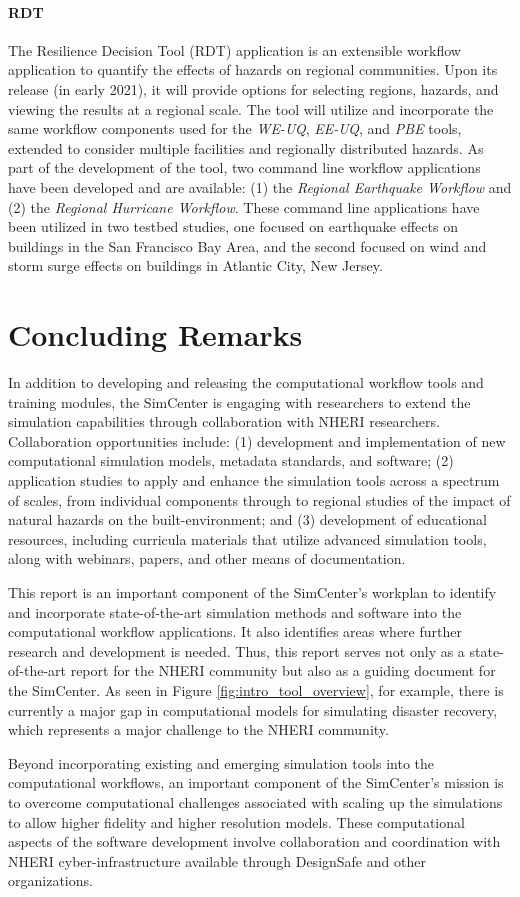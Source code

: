 \paragraph{RDT} The Resilience Decision Tool (RDT) application is an extensible workflow application to quantify the effects of hazards on regional communities. Upon its release (in early 2021), it will provide options for selecting regions, hazards, and viewing the results at a regional scale. The tool will utilize and incorporate the same workflow components used for the \emph{WE-UQ}, \emph{EE-UQ}, and \emph{PBE} tools, extended to consider multiple facilities and regionally distributed hazards. As part of the development of the tool, two command line workflow applications have been developed and are available: (1) the \emph{Regional Earthquake Workflow} and (2) the \emph{Regional Hurricane Workflow}.  These command line  applications have been utilized in two testbed studies, one focused on earthquake effects on buildings in the San Francisco Bay Area, and the second focused on wind and storm surge effects on buildings in Atlantic City, New Jersey.

\section{Concluding Remarks}

In addition to developing and releasing the computational workflow tools and training modules, the SimCenter is engaging with researchers to extend the simulation capabilities through collaboration with NHERI researchers. Collaboration opportunities include: (1) development and implementation of new computational simulation models, metadata standards, and software; (2) application studies to apply and enhance the simulation tools across a spectrum of scales, from individual components through to regional studies of the impact of natural hazards on the built-environment; and (3) development of educational resources, including curricula materials that utilize advanced simulation tools, along with webinars, papers, and other means of documentation. 

This report is an important component of the SimCenter’s workplan to identify and incorporate state-of-the-art simulation methods and software into the computational workflow applications. It also identifies areas where further research and development is needed.  Thus, this report serves not only as a state-of-the-art report for the NHERI community but also as a guiding document for the SimCenter.  As seen in Figure \ref{fig:intro_tool_overview}, for example, there is currently a major gap in computational models for simulating disaster recovery, which represents a major challenge to the NHERI community. 

Beyond incorporating existing and emerging simulation tools into the computational workflows, an important component of the SimCenter’s mission is to overcome computational challenges associated with scaling up the simulations to allow higher fidelity and higher resolution models.  These computational aspects of the software development involve collaboration and coordination with NHERI cyber-infrastructure available through DesignSafe and other organizations. 